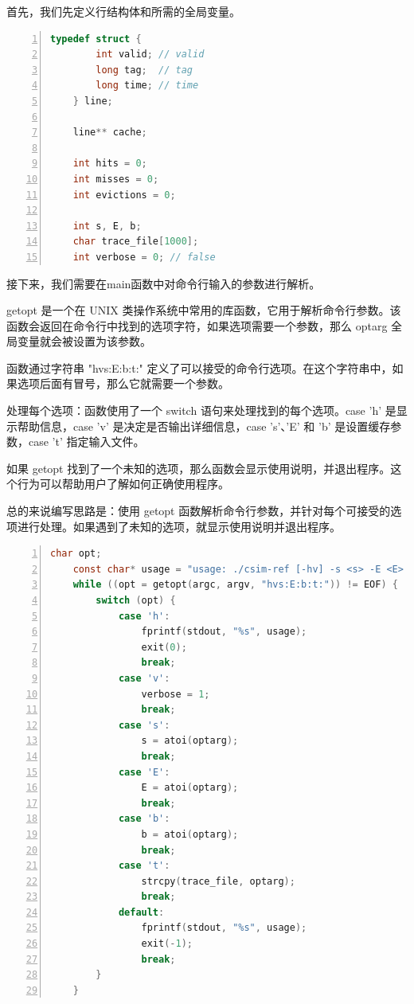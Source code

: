 \documentclass{article}
\begin{document}
首先，我们先定义行结构体和所需的全局变量。
\begin{lstlisting}[xleftmargin = 4em,xrightmargin = 4em, aboveskip = 1em, numbers = left, language = C]
    typedef struct {
        int valid; // valid
        long tag;  // tag
        long time; // time
    } line;

    line** cache;

    int hits = 0;
    int misses = 0;
    int evictions = 0;

    int s, E, b;
    char trace_file[1000];
    int verbose = 0; // false
\end{lstlisting}

接下来，我们需要在main函数中对命令行输入的参数进行解析。

getopt 是一个在 UNIX 类操作系统中常用的库函数，它用于解析命令行参数。该函数会返回在命令行中找到的选项字符，如果选项需要一个参数，那么 optarg 全局变量就会被设置为该参数。

函数通过字符串 "hvs:E:b:t:" 定义了可以接受的命令行选项。在这个字符串中，如果选项后面有冒号，那么它就需要一个参数。

处理每个选项：函数使用了一个 switch 语句来处理找到的每个选项。case 'h' 是显示帮助信息，case 'v' 是决定是否输出详细信息，case 's'、'E' 和 'b' 是设置缓存参数，case 't' 指定输入文件。

如果 getopt 找到了一个未知的选项，那么函数会显示使用说明，并退出程序。这个行为可以帮助用户了解如何正确使用程序。

总的来说编写思路是：使用 getopt 函数解析命令行参数，并针对每个可接受的选项进行处理。如果遇到了未知的选项，就显示使用说明并退出程序。

\begin{lstlisting}[xleftmargin = 4em,xrightmargin = 4em, aboveskip = 1em, numbers = left, language = C]
    char opt;
    const char* usage = "usage: ./csim-ref [-hv] -s <s> -E <E> -b <b> -t <tracefile>";
    while ((opt = getopt(argc, argv, "hvs:E:b:t:")) != EOF) {
        switch (opt) {
            case 'h':
                fprintf(stdout, "%s", usage);
                exit(0);
                break;
            case 'v':
                verbose = 1;
                break;
            case 's':
                s = atoi(optarg);
                break;
            case 'E':
                E = atoi(optarg);
                break;
            case 'b':
                b = atoi(optarg);
                break;
            case 't':
                strcpy(trace_file, optarg);
                break;
            default:
                fprintf(stdout, "%s", usage);
                exit(-1);
                break;
        }
    }
\end{lstlisting}
\end{document}
